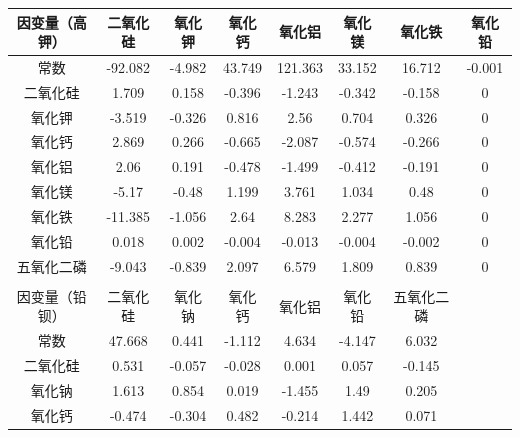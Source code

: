 \documentclass[withoutpreface,bwprint]{cumcmthesis} %
\begin{document}
\begin{appendices}
\begin{table}[H]
  \begin{tabular}{cccccccc}
    \toprule[1.5pt]
    因变量（高钾）            & 二氧化硅     &氧化钾     & 氧化钙    & 氧化铝      & 氧化镁    & 氧化铁       & 氧化铅 \\ \hline
    常数              & -92.082       & -4.982       & 43.749      & 121.363       & 33.152      & 16.712         & -0.001   \\
    二氧化硅  & 1.709         & 0.158        & -0.396      & -1.243        & -0.342      & -0.158         & 0        \\
    氧化钾  & -3.519        & -0.326       & 0.816       & 2.56          & 0.704       & 0.326          & 0        \\
    氧化钙   & 2.869         & 0.266        & -0.665      & -2.087        & -0.574      & -0.266         & 0        \\
    氧化铝  & 2.06          & 0.191        & -0.478      & -1.499        & -0.412      & -0.191         & 0        \\
    氧化镁    & -5.17         & -0.48        & 1.199       & 3.761         & 1.034       & 0.48           & 0        \\
    氧化铁  & -11.385       & -1.056       & 2.64        & 8.283         & 2.277       & 1.056          & 0        \\
    氧化铅    & 0.018         & 0.002        & -0.004      & -0.013        & -0.004      & -0.002         & 0        \\
    五氧化二磷 & -9.043        & -0.839       & 2.097       & 6.579         & 1.809       & 0.839          & 0        \\
    &               &              &             &               &             &                &          \\
    因变量（铅钡）            & 二氧化硅 & 氧化钠 & 氧化钙 & 氧化铝 & 氧化铅 & 五氧化二磷 &          \\
    常数              & 47.668        & 0.441        & -1.112      & 4.634         & -4.147      & 6.032          &          \\
    二氧化硅      & 0.531         & -0.057       & -0.028      & 0.001         & 0.057       & -0.145         &          \\
    氧化钠      & 1.613         & 0.854        & 0.019       & -1.455        & 1.49        & 0.205          &          \\
    氧化钙       & -0.474        & -0.304       & 0.482       & -0.214        & 1.442       & 0.071          &          \\

\end{tabular}
\end{table}
\end{appendices}
\end{document}
